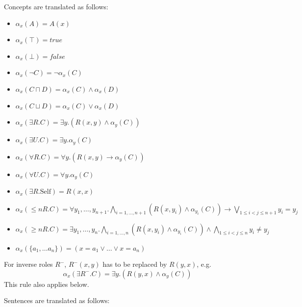 \documentclass[10pt, a4paper]{isov2}
\begin{document}


Concepts are translated as follows:
\begin{itemize}
 \item $\alpha_x(A) = A(x)$
 \item $\alpha_x(\top) = \mathit{true}$
 \item $\alpha_x(\bot) = \mathit{false}$
 \item $\alpha_x(\lnot C) = \lnot \alpha_x (C)$
 \item $\alpha_x(C \sqcap D) = \alpha_x(C) \land \alpha_x(D)$
 \item $\alpha_x(C \sqcup D) = \alpha_x(C) \lor \alpha_x(D)$ 
 \item $\alpha_x(\exists R.C) = \exists y . (R(x,y) \land \alpha_y(C))$
 \item $\alpha_x(\exists U.C) = \exists y . \alpha_y(C)$
 \item $\alpha_x(\forall R.C) = \forall y . (R(x,y) \rightarrow \alpha_y(C))$
 \item $\alpha_x(\forall U.C) = \forall y . \alpha_y(C)$
 \item $\alpha_x(\exists R.\text{Self}) = R(x,x)$
 \item $\alpha_x(\leq n R. C) = \forall y_1,\ldots,y_{n+1} .  \bigwedge_{i=1,\ldots,n+1}(R(x,y_i) \land \alpha_{y_i}(C)) \rightarrow\bigvee_{1\leq i<j\leq n+1}y_i = y_j$
 \item $\alpha_x(\geq n R. C) = \exists y_1,\ldots,y_n . \bigwedge_{i=1,\ldots,n}(R(x,y_i) \land \alpha_{y_i}(C)) \wedge \bigwedge_{1\leq i<j\leq n}y_i\not= y_j $
 \item $\alpha_x(\{a_1, \ldots a_n \}) = (x=a_1\vee \ldots \vee x=a_n)$
\end{itemize}

For inverse roles $R^-$, $R^-(x,y)$ has to be replaced by $R(y,x)$, e.g.
 $$\alpha_x(\exists R^-.C) = \exists y . (R(y,x) \land \alpha_y(C))$$
This rule also applies below.


Sentences are translated as follows:
\end{document}
